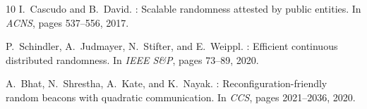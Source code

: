 \documentclass[11pt,a4paper]{article}
\begin{document}
\begin{thebibliography}{10}
I.~Cascudo and B.~David.
: Scalable randomness attested by public entities.
\newblock In {\em ACNS}, pages 537--556, 2017.

P.~Schindler, A.~Judmayer, N.~Stifter, and E.~Weippl.
: Efficient continuous distributed randomness.
\newblock In {\em IEEE S\&P}, pages 73--89, 2020.

A.~Bhat, N.~Shrestha, A.~Kate, and K.~Nayak.
: Reconfiguration-friendly random beacons with quadratic communication.
\newblock In {\em CCS}, pages 2021--2036, 2020.

\end{thebibliography}
\end{document}
